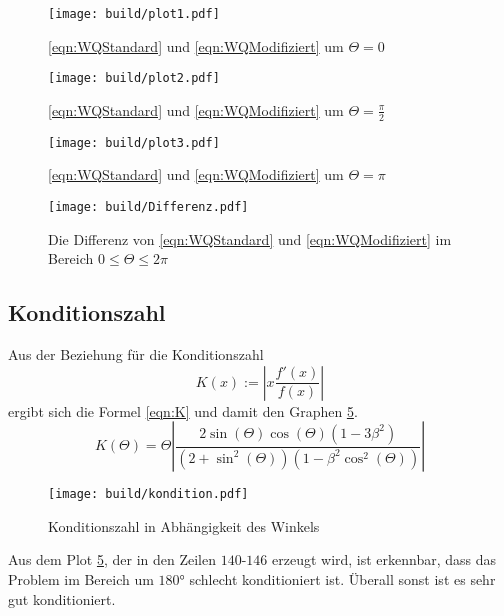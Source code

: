 \begin{figure}
  \centering
  \texttt{[image: build/plot1.pdf]}
  \caption{\eqref{eqn:WQStandard} und \eqref{eqn:WQModifiziert} um $\Theta = 0$}
  \label{fig:t0}
\end{figure}

\begin{figure}
  \centering
  \texttt{[image: build/plot2.pdf]}
  \caption{\eqref{eqn:WQStandard} und \eqref{eqn:WQModifiziert} um $\Theta = \frac{\pi}{2}$}
  \label{fig:tpi2}
\end{figure}

\begin{figure}
  \centering
  \texttt{[image: build/plot3.pdf]}
  \caption{\eqref{eqn:WQStandard} und \eqref{eqn:WQModifiziert} um $\Theta = \pi$}
  \label{fig:tpi}
\end{figure}

\begin{figure}
  \centering
  \texttt{[image: build/Differenz.pdf]}
  \caption{Die Differenz von \eqref{eqn:WQStandard} und \eqref{eqn:WQModifiziert} im Bereich $0 \leq \Theta \leq 2\pi$}
  \label{fig:Abweichung}
\end{figure}

\newpage

\subsection{Konditionszahl}
Aus der Beziehung für die Konditionszahl
\begin{equation}
  K(x):=\left|x\frac{f'(x)}{f(x)}\right|
\end{equation}
ergibt sich die Formel \eqref{eqn:K} und damit den Graphen \ref{fig:kondition}.
\begin{equation}
  K(\Theta)= \Theta  \left|\frac{2\sin(\Theta)\cos(\Theta)\left(1-3\beta^2\right)}{\left(2+\sin^2(\Theta)\right)\left(1-\beta^2\cos^2(\Theta)\right)}\right| \label{eqn:K}
\end{equation}

\begin{figure}
  \centering
  \texttt{[image: build/kondition.pdf]}
  \caption{Konditionszahl in Abhängigkeit des Winkels}
  \label{fig:kondition}
\end{figure}
\noindent Aus dem Plot \ref{fig:kondition}, der in den Zeilen $140$-$146$ erzeugt wird, ist erkennbar, dass das Problem im Bereich um $180\si{\degree}$ schlecht konditioniert ist.
Überall sonst ist es sehr gut konditioniert.





